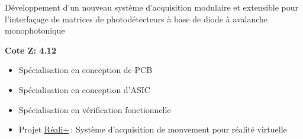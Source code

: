 \documentclass[10pt,a4paper,withhyper]{altacv}
\begin{document}
\begin{paracol}{2}

\nocite{*}

\printbibliography[heading=pubtype,title={\printinfo{\faBook}{Books}},type=book]

\switchcolumn



\divider
{} 

\medskip
{}

Développement d’un nouveau système d’acquisition modulaire et extensible pour l’interfaçage de matrices de photodétecteurs à base de diode à avalanche monophotonique

\divider

\vspace{18pt}
\hfill\begin{minipage}{2cm}
    \textbf{\color{heading}\small Cote Z: 4.12}
\end{minipage}
\vspace{-28pt}


\begin{itemize}
\item Spécialisation en conception de PCB
\item Spécialisation en conception d'ASIC
\item Spécialisation en vérification fonctionnelle
\item Projet \href{https://github.com/orgs/Reali-Plus/repositories}{Réali+}\,: Système d'acquisition de mouvement pour réalité virtuelle
\end{itemize}


\end{paracol}
\end{document}
